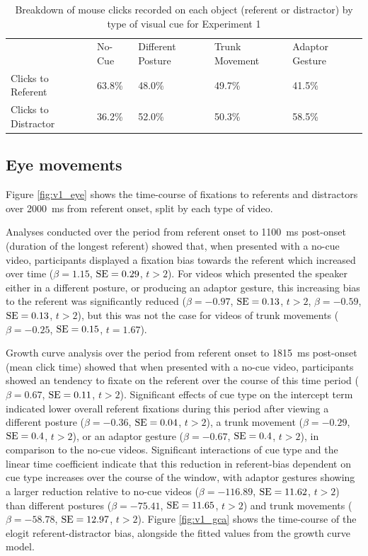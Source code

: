 \documentclass[a4paper,man,natbib]{apa6}
\newcommand{\resultsLM}[3]{$\beta = #1$, $\textnormal{SE} = #2$, $t #3$}
\begin{document}
\begin{table}
\caption{Breakdown of mouse clicks recorded on each object (referent or distractor) by type of visual cue for Experiment 1}
\label{table:v1_clicks}
\begin{tabularx}{\linewidth}{YYYYY}
\hline
& No-Cue & Different Posture & Trunk Movement & Adaptor Gesture \\
Clicks to Referent & 63.8\% & 48.0\% & 49.7\% & 41.5\%  \\ 
Clicks to Distractor & 36.2\% & 52.0\% & 50.3\% & 58.5\% \\
\hline
\end{tabularx}
\end{table}

\subsection{Eye movements}
Figure \ref{fig:v1_eye} shows the time-course of fixations to referents and distractors over 2000~ms from referent onset, split by each type of video.

Analyses conducted over the period from referent onset to 1100~ms post-onset (duration of the longest referent) showed that, when presented with a no-cue video, participants displayed a fixation bias towards the referent which increased over time (\resultsLM{1.15}{0.29}{>2}).
For videos which presented the speaker either in a different posture, or producing an adaptor gesture, this increasing bias to the referent was significantly reduced
(\resultsLM{-0.97}{0.13}{>2}, \resultsLM{-0.59}{0.13}{>2}), but this was not the case for videos of trunk movements (\resultsLM{-0.25}{0.15}{=1.67}). 

Growth curve analysis over the period from referent onset to 1815~ms post-onset (mean click time) showed that when presented with a no-cue video, participants showed an tendency to fixate on the referent over the course of this time period (\resultsLM{0.67}{0.11}{>2}). %
Significant effects of cue type on the intercept term indicated lower overall referent fixations during this period after viewing a different posture (\resultsLM{-0.36}{0.04}{>2}), a trunk movement (\resultsLM{-0.29}{0.4}{>2}), or an adaptor gesture (\resultsLM{-0.67}{0.4}{>2}), in comparison to the no-cue videos.
Significant interactions of cue type and the linear time coefficient indicate that this reduction in referent-bias dependent on cue type increases over the course of the window, with adaptor gestures showing a larger reduction relative to no-cue videos (\resultsLM{-116.89}{11.62}{>2}) than different postures (\resultsLM{-75.41}{11.65}{>2}) and trunk movements (\resultsLM{-58.78}{12.97}{>2}). 
Figure \ref{fig:v1_gca} shows the time-course of the elogit referent-distractor bias, alongside the fitted values from the growth curve model. 
\end{document}
